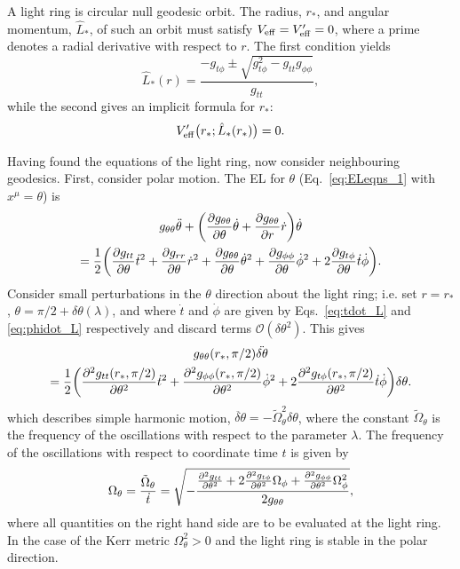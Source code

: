 A light ring is circular null geodesic orbit. 
The radius, $r_*$, and angular momentum, $\hat{L}_*$, of such an orbit must satisfy $V_{\rm eff} = V'_{\rm eff} = 0$, where a prime denotes a radial derivative with respect to $r$. The first condition yields
\begin{equation}
	\hat{L}_*(r) = \frac{-g_{t \phi} \pm \sqrt{g_{t \phi}^2 - g_{t t}g_{\phi \phi}}}{g_{t t}},
\end{equation}
while the second gives an implicit formula for $r_*$:
\begin{gather}
	V'_{\rm eff}\big(r_*;\hat{L}_*(r_*)\big) = 0.
\end{gather}

Having found the equations of the light ring, now consider neighbouring geodesics. 
First, consider polar motion. The EL for $\theta$ (Eq.~\ref{eq:ELeqns_1} with $x^\mu=\theta$) is 
\begin{multline}\label{eq:el_theta}
	g_{\theta \theta} \ddot{\theta} + \qty(\pdv{g_{\theta \theta}}{\theta} \dot{\theta} + \pdv{g_{\theta \theta}}{r} \dot{r}) \dot{\theta} \\
	= \frac{1}{2} \bigg(\pdv{g_{t t}}{\theta} \dot{t}^2 + \pdv{g_{r r}}{\theta} \dot{r}^2 + \pdv{g_{\theta \theta}}{\theta} \dot{\theta}^2 + \pdv{g_{\phi \phi}}{\theta} \dot{\phi}^2 + 2\pdv{g_{t \phi}}{\theta} \dot{t}\dot{\phi}\bigg).
\end{multline}
Consider small perturbations in the $\theta$ direction about the light ring; i.e. set $r = r_*$, $\theta = \pi/2+\delta\theta(\lambda)$, and where $\dot{t}$ and $\dot{\phi}$ are given by Eqs.~\ref{eq:tdot_L} and \ref{eq:phidot_L} respectively and discard terms $\mathcal{O}(\delta\theta^2)$. 
This gives
\begin{multline}\label{eq:el_theta_expanded}
	g_{\theta \theta}(r_*,\pi/2) \ddot{\delta \theta} \\
 = \frac{1}{2} \bigg(\pdv[2]{g_{t t}(r_*,\pi/2)}{\theta} \dot{t}^2 + \pdv[2]{g_{\phi\phi}(r_*,\pi/2)}{\theta} \dot{\phi}^2 + 2\pdv[2]{g_{t \phi}(r_*,\pi/2)}{\theta} \dot{t}\dot{\phi}\bigg)\delta \theta.
\end{multline}
which describes simple harmonic motion, $\ddot{\delta\theta}=-\tilde{\Omega}^2_\theta\delta\theta$, where the constant $\tilde{\Omega}_\theta$ is the frequency of the oscillations with respect to the parameter $\lambda$.
The frequency of the oscillations with respect to coordinate time $t$ is given by
\begin{align}
	\Omega_\theta = \frac{\tilde{\Omega}_\theta}{\dot{t}} =\sqrt{-\frac{
			\pdv[2]{g_{t t}}{\theta} +2\pdv[2]{g_{t \phi}}{\theta} \Omega_\phi + \pdv[2]{g_{\phi\phi}}{\theta} \Omega_\phi^2
		}{2g_{\theta \theta}}} ,
\end{align}
where all quantities on the right hand side are to be evaluated at the light ring. 
In the case of the Kerr metric $\Omega_\theta^2>0$ and the light ring is stable in the polar direction.

